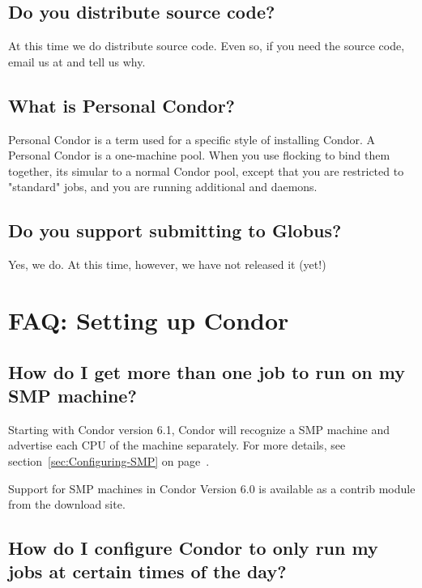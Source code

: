 \subsection{Do you distribute source code?}

At this time we do  distribute source code.
Even so, if you need the source code, email us at  and tell us why.

\subsection{What is Personal Condor?}

Personal Condor is a term used for a specific style of installing Condor.
A Personal Condor is a one-machine pool.  When you use flocking to bind
them together, its simular to a normal Condor pool, except that you are restricted
to "standard" jobs, and you are running additional  and  
daemons.

\subsection{Do you support submitting to Globus?}

Yes, we do.  At this time, however, we have not released it (yet!)



\section{FAQ: Setting up Condor}


\subsection{How do I get more than one job to run on my SMP machine?}

Starting with Condor version 6.1, Condor will recognize a SMP machine and advertise each CPU of the
machine separately.  For more details, see section~\ref{sec:Configuring-SMP} on page~\pageref{sec:Configuring-SMP}.

Support for SMP machines in Condor Version 6.0 is available as a contrib module from the download site.

\subsection{How do I configure Condor to only run my jobs at certain times of the day?}

